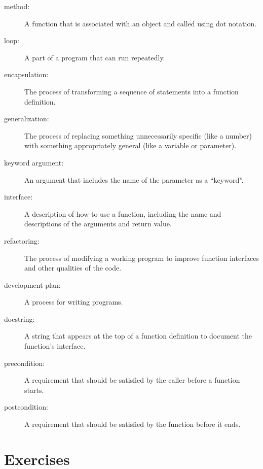\documentclass[10pt]{book}
\begin{document}
\begin{description}

\item[method:] A function that is associated with an object and called
using dot notation.

\item[loop:] A part of a program that can run repeatedly.

\item[encapsulation:] The process of transforming a sequence of
statements into a function definition.

\item[generalization:] The process of replacing something
unnecessarily specific (like a number) with something appropriately
general (like a variable or parameter).

\item[keyword argument:] An argument that includes the name of
the parameter as a ``keyword''.

\item[interface:] A description of how to use a function, including
the name and descriptions of the arguments and return value.

\item[refactoring:] The process of modifying a working program to
  improve function interfaces and other qualities of the code.

\item[development plan:] A process for writing programs.

\item[docstring:] A string that appears at the top of a function
  definition to document the function's interface.

\item[precondition:] A requirement that should be satisfied by
the caller before a function starts.

\item[postcondition:] A requirement that should be satisfied by
the function before it ends.

\end{description}


\section{Exercises}
\end{document}

